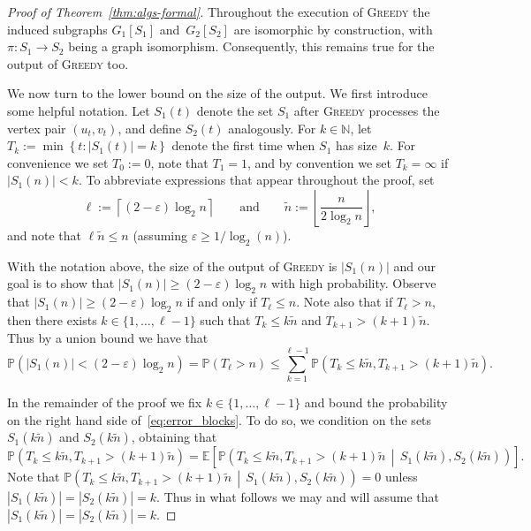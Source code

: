 \documentclass[11pt]{article}
\theoremstyle{plain}
\theoremstyle{definition}
\theoremstyle{remark}
\newcommand{\greedy}{\textsc{Greedy} }
\newcommand{\E}{\mathbb{E}}
\newcommand{\N}{\mathbb{N}}
\newcommand{\eps}{\varepsilon}
\renewcommand{\Pr}{\mathbb{P}}
\begin{document}
\begin{proof}[Proof of Theorem~\ref{thm:algs-formal}]
Throughout the execution of \greedy the induced subgraphs 
$G_{1}[S_{1}]$ and~$G_{2}[S_{2}]$ 
are isomorphic by construction, 
with $\pi : S_{1} \to S_{2}$ being a graph isomorphism. 
Consequently, this remains true for the output of \greedy too. 

We now turn to the lower bound on the size of the output. 
We first introduce some helpful notation. 
Let $S_{1}(t)$ denote the set $S_{1}$ after \greedy processes the vertex pair $(u_{t}, v_{t})$, 
and define $S_{2}(t)$ analogously. 
For $k \in \N$, let $T_{k} := \min \left\{ t : |S_{1}(t)| = k \right\}$ denote the first time when $S_{1}$ has size~$k$. 
For convenience we set $T_{0} := 0$, note that $T_{1} = 1$, and by convention we set $T_{k} = \infty$ if $|S_{1}(n)| < k$. 
To abbreviate expressions that appear throughout the proof, 
set 
\[
\ell := \left\lceil (2-\eps) \log_2 n \right\rceil
\qquad 
\text{and} 
\qquad 
\widetilde{n} := \left\lfloor \frac{n}{2 \log_2 n} \right\rfloor,
\]
and note that $\ell \widetilde{n} \leq n$ (assuming $\eps \geq 1/\log_{2}(n)$).

With the notation above, the size of the output of \greedy is $|S_{1}(n)|$ 
and our goal is to show that $|S_{1}(n)| \geq (2-\eps) \log_2 n$ 
with high probability. 
Observe that $|S_{1}(n)| \geq (2-\eps) \log_2 n$ if and only if $T_{\ell} \leq n$. 
Note also that if $T_{\ell} > n$, 
then there exists $k \in \{1, \ldots, \ell - 1\}$ such that 
$T_{k} \leq k \widetilde{n}$ and $T_{k+1} > (k+1) \widetilde{n}$. Thus by a union bound we have that 
\begin{equation}\label{eq:error_blocks}
\Pr \left( |S_{1}(n)| < (2-\eps) \log_{2}n \right) 
= \Pr( T_{\ell} > n )
\leq \sum_{k=1}^{\ell-1} \Pr \left( T_{k} \leq k \widetilde{n}, T_{k+1} > (k+1) \widetilde{n} \right).
\end{equation}

In the remainder of the proof we fix $k \in \{1, \ldots, \ell - 1\}$
and bound the probability on the right hand side of~\eqref{eq:error_blocks}. 
To do so, we condition on the sets $S_{1}(k \widetilde{n})$ and $S_{2}(k \widetilde{n})$, obtaining that 
\[
\Pr \left( T_{k} \leq k \widetilde{n}, T_{k+1} > (k+1) \widetilde{n} \right) 
= \E \left[ \Pr \left( T_{k} \leq k \widetilde{n}, T_{k+1} > (k+1) \widetilde{n} \, \middle| \, S_{1}(k \widetilde{n}), S_{2}(k \widetilde{n}) \right)  \right].
\]
Note that 
$\Pr \left( T_{k} \leq k \widetilde{n}, T_{k+1} > (k+1) \widetilde{n} \, \middle| \, S_{1}(k \widetilde{n}), S_{2}(k \widetilde{n}) \right) = 0$ 
unless 
$|S_{1}(k \widetilde{n})| = |S_{2}(k \widetilde{n})| = k$. 
Thus in what follows we may and will assume that 
$|S_{1}(k \widetilde{n})| = |S_{2}(k \widetilde{n})| = k$. 


\end{proof}
\end{document}

